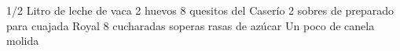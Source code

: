 1/2 Litro de leche de vaca
2 huevos
8 quesitos del Caserío
2 sobres de preparado para cuajada Royal
8 cucharadas soperas rasas de azúcar
Un poco de canela molida
